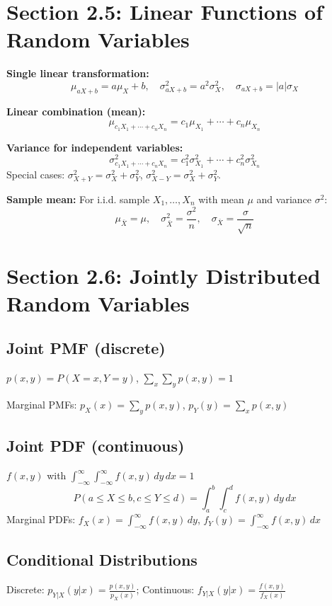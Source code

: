 \documentclass[11pt]{article}
\begin{document}
\section*{Section 2.5: Linear Functions of Random Variables}
\textbf{Single linear transformation:}
\[
\mu_{aX+b}=a\mu_X+b,\quad \sigma_{aX+b}^2=a^2\sigma_X^2,\quad \sigma_{aX+b}=|a|\sigma_X
\]

\textbf{Linear combination (mean):}
\[
\mu_{c_1X_1+\cdots+c_nX_n}=c_1\mu_{X_1}+\cdots+c_n\mu_{X_n}
\]

\textbf{Variance for independent variables:}
\[
\sigma_{c_1X_1+\cdots+c_nX_n}^2 = c_1^2\sigma_{X_1}^2+\cdots+c_n^2\sigma_{X_n}^2
\]
Special cases: \(\sigma_{X+Y}^2=\sigma_X^2+\sigma_Y^2\), \(\sigma_{X-Y}^2=\sigma_X^2+\sigma_Y^2\).

\textbf{Sample mean:} For i.i.d. sample \(X_1,\dots,X_n\) with mean \(\mu\) and variance \(\sigma^2\):
\[
\mu_{\bar{X}}=\mu,\quad \sigma_{\bar{X}}^2=\frac{\sigma^2}{n},\quad \sigma_{\bar{X}}=\frac{\sigma}{\sqrt{n}}
\]

\section*{Section 2.6: Jointly Distributed Random Variables}
\subsection*{Joint PMF (discrete)}
\(p(x,y)=P(X=x,Y=y)\), \(\sum_x\sum_y p(x,y)=1\)

Marginal PMFs: \(p_X(x)=\sum_y p(x,y)\), \(p_Y(y)=\sum_x p(x,y)\)

\subsection*{Joint PDF (continuous)}
\(f(x,y)\) with \(\int_{-\infty}^{\infty}\int_{-\infty}^{\infty} f(x,y)\,dy\,dx=1\)
\[
P(a\le X\le b, c\le Y\le d)=\int_a^b\int_c^d f(x,y)\,dy\,dx
\]
Marginal PDFs: \(f_X(x)=\int_{-\infty}^{\infty} f(x,y)\,dy\), \(f_Y(y)=\int_{-\infty}^{\infty} f(x,y)\,dx\)

\subsection*{Conditional Distributions}
Discrete: \(p_{Y|X}(y|x)=\frac{p(x,y)}{p_X(x)}\); Continuous: \(f_{Y|X}(y|x)=\frac{f(x,y)}{f_X(x)}\)
\end{document}
